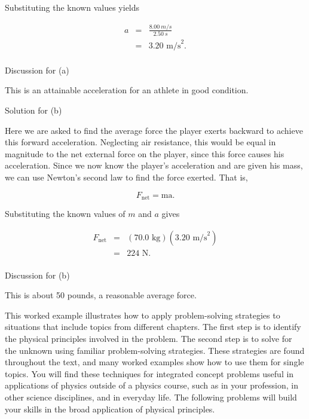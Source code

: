 \documentclass[
]{book}
\begin{document}
Substituting the known values yields

\leavevmode{}%
\[\begin{array}{lll}
a & = & \frac{8.00\ m/s}{2\text{.}50\ s} \\
 & = & {3\text{.}\text{20\ m/s}^{2}.} \\
\end{array}{}\]

{Discussion for (a)}

This is an attainable acceleration for an athlete in good condition.

{Solution for (b)}

Here we are asked to find the average force the player exerts backward
to achieve this forward acceleration. Neglecting air resistance, this
would be equal in magnitude to the net external force on the player,
since this force causes his acceleration. Since we now know the player's
acceleration and are given his mass, we can use Newton's second law to
find the force exerted. That is,

\leavevmode{}%
\[{F_{\text{net}} = \text{ma}}.\]

Substituting the known values of \(m{}\) and \(a{}\) gives

\leavevmode{}%
\[\begin{array}{lll}
F_{\text{net}} & = & {(\text{70.0\ kg})(3\text{.}\text{20\ m/s}^{2})} \\
 & = & {\text{224\ N}.} \\
\end{array}{}\]

{Discussion for (b)}

This is about 50 pounds, a reasonable average force.

This worked example illustrates how to apply problem-solving strategies
to situations that include topics from different chapters. The first
step is to identify the physical principles involved in the problem. The
second step is to solve for the unknown using familiar problem-solving
strategies. These strategies are found throughout the text, and many
worked examples show how to use them for single topics. You will find
these techniques for integrated concept problems useful in applications
of physics outside of a physics course, such as in your profession, in
other science disciplines, and in everyday life. The following problems
will build your skills in the broad application of physical principles.
\end{document}
